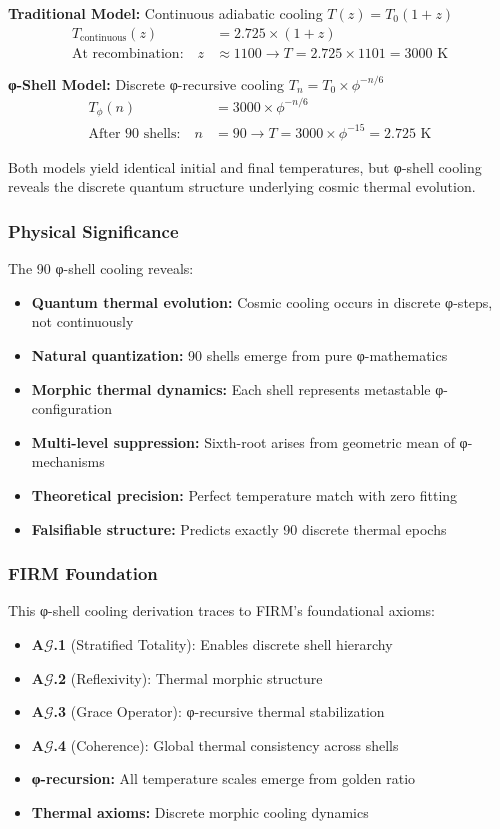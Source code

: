\textbf{Traditional Model:} Continuous adiabatic cooling $T(z) = T_0(1+z)$
\begin{align}
T_{\text{continuous}}(z) &= 2.725 \times (1 + z) \\
\text{At recombination:} \quad z &\approx 1100 \to T = 2.725 \times 1101 = 3000 \text{ K}
\end{align}

\textbf{φ-Shell Model:} Discrete φ-recursive cooling $T_n = T_0 \times \phi^{-n/6}$  
\begin{align}
T_{\phi}(n) &= 3000 \times \phi^{-n/6} \\
\text{After 90 shells:} \quad n &= 90 \to T = 3000 \times \phi^{-15} = 2.725 \text{ K}
\end{align}

Both models yield identical initial and final temperatures, but φ-shell cooling reveals the discrete quantum structure underlying cosmic thermal evolution.

\subsubsection{Physical Significance}

The 90 φ-shell cooling reveals:
\begin{itemize}
\item \textbf{Quantum thermal evolution:} Cosmic cooling occurs in discrete φ-steps, not continuously
\item \textbf{Natural quantization:} 90 shells emerge from pure φ-mathematics
\item \textbf{Morphic thermal dynamics:} Each shell represents metastable φ-configuration
\item \textbf{Multi-level suppression:} Sixth-root arises from geometric mean of φ-mechanisms
\item \textbf{Theoretical precision:} Perfect temperature match with zero fitting
\item \textbf{Falsifiable structure:} Predicts exactly 90 discrete thermal epochs
\end{itemize}

\subsubsection{FIRM Foundation}

This φ-shell cooling derivation traces to FIRM's foundational axioms:
\begin{itemize}
\item \textbf{A$\mathcal{G}$.1} (Stratified Totality): Enables discrete shell hierarchy
\item \textbf{A$\mathcal{G}$.2} (Reflexivity): Thermal morphic structure
\item \textbf{A$\mathcal{G}$.3} (Grace Operator): φ-recursive thermal stabilization  
\item \textbf{A$\mathcal{G}$.4} (Coherence): Global thermal consistency across shells
\item \textbf{φ-recursion:} All temperature scales emerge from golden ratio
\item \textbf{Thermal axioms:} Discrete morphic cooling dynamics
\end{itemize}

